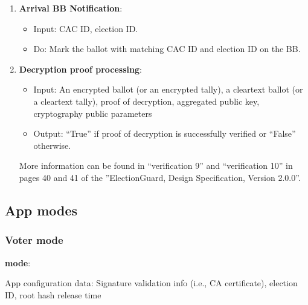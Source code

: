 \documentclass{article}
\begin{document}
\begin{enumerate}
\begin{itemize}
\begin{itemize}
    \end{itemize}
\end{itemize}
\label{Valid Vote Arrival}
    \item \textbf{Arrival BB Notification}:
\begin{itemize}
    \item Input: CAC ID, election ID.
    \item Do: Mark the ballot with matching CAC ID and election ID on the BB.

\end{itemize}
\label{BB Notification of Valid Vote Arrival}
\item \textbf{Decryption proof processing}:
\begin{itemize}
    \item Input: An encrypted ballot  (or an encrypted tally), a cleartext ballot (or a cleartext tally), proof of decryption, aggregated public key, cryptography public parameters
    \item Output: ``True'' if proof of decryption is successfully verified or ``False'' otherwise.
\end{itemize}
More information can be found in ``verification 9'' and ``verification 10'' in pages 40 and 41 of the ''ElectionGuard, Design Specification,
Version 2.0.0''.
\label{Decryption proof processing}
\end{enumerate}

    

\subsection{App modes}
\subsubsection{Voter mode}

\textbf{\BBInclusionCheck{} mode}:


App configuration data: Signature validation info (i.e., CA certificate), election ID, root hash release time 
\end{document}
